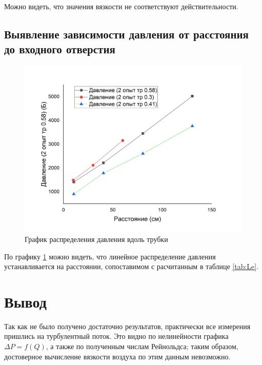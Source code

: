 \documentclass[a4paper]{article}
\begin{document}
Можно видеть, что значения вязкости не соответствуют действительности.
\subsection{Выявление зависимости давления от расстояния до входного отверстия}
\begin{figure}[p]
	\centering
		\includegraphics[scale=0.2]{3.jpg}
	\caption{График распределения давления вдоль трубки}
	\label{fig:Pi}
\end{figure}
По графику \ref{fig:Pi} можно видеть, что линейное распределение давления устанавливается на расстоянии, сопоставимом с расчитанным в таблице \ref{tab:Le}.
\section{Вывод}
Так как не было получено достаточно результатов, практически все измерения пришлись на турбулентный поток. Это видно по нелинейности графика $\Delta P = f(Q)$, а также по полученным числам Рейнольдса; таким образом, достоверное вычисление вязкости воздуха по этим данным невозможно.
\end{document}
